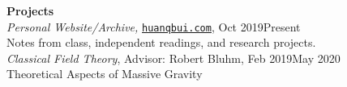 \documentclass[10pt]{article}
\begin{document}



\noindent \large{\textbf{{Projects}}}	\normalsize  \\ 
\noindent \textit{Personal Website/Archive,}
\href{https://huanqbui.com}{\texttt{huanqbui.com}}, {Oct 2019\textendash Present} \\
\noindent Notes from class, independent readings, and research projects.\\

\noindent \textit{Classical Field Theory}, Advisor: Robert Bluhm, {Feb 2019\textendash May 2020}\\
\noindent Theoretical Aspects of Massive Gravity\\





%
%
%












\end{document}
